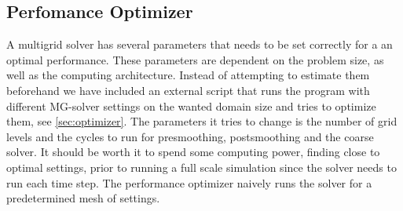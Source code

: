   \subsection{Perfomance Optimizer}
    A multigrid solver has several parameters that needs to be set correctly for
    a an optimal performance. These parameters are dependent on the problem size,
    as well as the computing architecture. Instead of attempting to estimate them beforehand
    we have included an external script that runs the program with different MG-solver
    settings on the wanted domain size and tries to optimize them, see \cref{sec:optimizer}.
    The parameters it tries to change is the number of grid levels and the cycles
    to run for presmoothing, postsmoothing and the coarse solver. It should be worth it
    to spend some computing power, finding close to optimal settings,  prior to
    running a full scale simulation since the solver needs to run each time step.
    The performance optimizer naively runs the solver for a predetermined mesh of
    settings.

